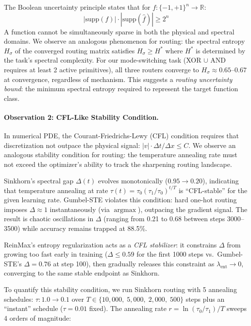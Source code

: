\documentclass[Royal,times,sageh]{sagej}
\begin{document}
The Boolean uncertainty principle \cite{odonnell2014analysis} states that for $f: \{-1,+1\}^n \to \mathbb{R}$:
\begin{equation}
    |\text{supp}(f)| \cdot |\text{supp}(\hat{f})| \geq 2^n
\end{equation}
A function cannot be simultaneously sparse in both the physical and spectral domains. We observe an analogous phenomenon for routing: the spectral entropy $H_\sigma$ of the converged routing matrix satisfies $H_\sigma \geq H^*$ where $H^*$ is determined by the task's spectral complexity. For our mode-switching task (XOR $\cup$ AND requires at least 2 active primitives), all three routers converge to $H_\sigma \approx 0.65$--$0.67$ at convergence, regardless of mechanism. This suggests a \textit{routing uncertainty bound}: the minimum spectral entropy required to represent the target function class.

\paragraph{Observation 2: CFL-Like Stability Condition.}

In numerical PDE, the Courant-Friedrichs-Lewy (CFL) condition requires that discretization not outpace the physical signal: $|v| \cdot \Delta t / \Delta x \leq C$. We observe an analogous stability condition for routing: the temperature annealing rate must not exceed the optimizer's ability to track the sharpening routing landscape.

Sinkhorn's spectral gap $\Delta(t)$ evolves monotonically ($0.95 \to 0.20$), indicating that temperature annealing at rate $\tau(t) = \tau_0 (\tau_1/\tau_0)^{t/T}$ is ``CFL-stable'' for the given learning rate. Gumbel-STE violates this condition: hard one-hot routing imposes $\Delta \approx 1$ instantaneously (via $\operatorname{argmax}$), outpacing the gradient signal. The result is chaotic oscillations in $\Delta$ (ranging from 0.21 to 0.68 between steps 3000--3500) while accuracy remains trapped at 88.5\%.

ReinMax's entropy regularization acts as a \textit{CFL stabilizer}: it constrains $\Delta$ from growing too fast early in training ($\Delta \leq 0.59$ for the first 1000 steps vs.\ Gumbel-STE's $\Delta = 0.76$ at step 100), then gradually releases this constraint as $\lambda_\text{ent} \to 0$, converging to the same stable endpoint as Sinkhorn.

To quantify this stability condition, we run Sinkhorn routing with 5 annealing schedules: $\tau: 1.0 \to 0.1$ over $T \in \{10{,}000,\; 5{,}000,\; 2{,}000,\; 500\}$ steps plus an ``instant'' schedule ($\tau = 0.01$ fixed). The annealing rate $r = \ln(\tau_0/\tau_1) / T$ sweeps 4 orders of magnitude:
\end{document}
